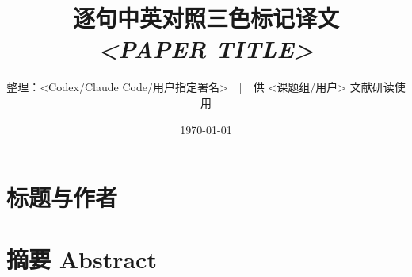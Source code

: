 \documentclass[11pt]{ctexart}
\title{\bfseries 逐句中英对照三色标记译文\\[4pt]\large \textit{<PAPER TITLE>}}
\author{整理：<Codex/Claude Code/用户指定署名>\ \ |\ \ 供 <课题组/用户> 文献研读使用}
\date{\today}
\begin{document}
\maketitle


\section*{标题与作者}

\section*{摘要 Abstract}

%
%
%

%
\end{document}
